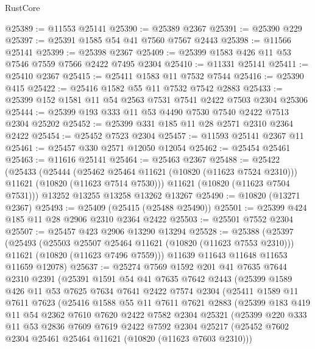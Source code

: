 \begin{lexlean}{RustCore}
\begin{coremodule}
@25389 := @11553 @25141
@25390 := @25389 @2367
@25391 := @25390 @229
@25397 := @25391 @1585 @54 @41 @7560 @7567 @2443
@25398 := @11566 @25141
@25399 := @25398 @2367
@25409 := @25399 @1583 @426 @11 @53 @7546 @7559 @7566 @2422 @7495 @2304
@25410 := @11331 @25141
@25411 := @25410 @2367
@25415 := @25411 @1583 @11 @7532 @7544
@25416 := @25390 @415
@25422 := @25416 @1582 @55 @11 @7532 @7542 @2883
@25433 := @25399 @152 @1581 @11 @54 @2563 @7531 @7541 @2422 @7503 @2304 @25306
@25444 := @25399 @193 @333 @11 @53 @4490 @7530 @7540 @2422 @7513 @2304 @25202
@25452 := @25399 @331 @185 @11 @28 @2571 @2310 @2364 @2422
@25454 := @25452 @7523 @2304
@25457 := @11593 @25141 @2367 @11
@25461 := @25457 @330 @2571 @12050 @12054
@25462 := @25454 @25461
@25463 := @11616 @25141
@25464 := @25463 @2367
@25488 := @25422
    (@25433
      (@25444
        (@25462 @25464 @11621 (@10820 (@11623 @7524 @2310)))
        @11621
        (@10820 (@11623 @7514 @7530)))
      @11621
      (@10820 (@11623 @7504 @7531)))
    @13252
    @13255
    @13258
    @13262
    @13267
@25490 := @10820 (@13271 @2367)
@25493 := @25409 (@25415 (@25488 @25490))
@25501 := @25399 @424 @185 @11 @28 @2906 @2310 @2364 @2422
@25503 := @25501 @7552 @2304
@25507 := @25457 @423 @2906 @13290 @13294
@25528 := @25388
    (@25397
      (@25493
        (@25503 @25507 @25464 @11621 (@10820 (@11623 @7553 @2310)))
        @11621
        (@10820 (@11623 @7496 @7559)))
      @11639
      @11643
      @11648
      @11653
      @11659
      @12078)
@25637 := @25274
    @7569
    @1592
    @201
    @41
    @7635
    @7644
    @2310
    @2391
    (@25391
      @1591
      @54
      @41
      @7635
      @7642
      @2443
      (@25399
        @1589
        @426
        @11
        @53
        @7625
        @7634
        @7641
        @2422
        @7574
        @2304
        (@25411
          @1589
          @11
          @7611
          @7623
          (@25416
            @1588
            @55
            @11
            @7611
            @7621
            @2883
            (@25399
              @183
              @419
              @11
              @54
              @2362
              @7610
              @7620
              @2422
              @7582
              @2304
              @25321
              (@25399
                @220
                @333
                @11
                @53
                @2836
                @7609
                @7619
                @2422
                @7592
                @2304
                @25217
                (@25452 @7602 @2304 @25461 @25464 @11621 (@10820 (@11623 @7603 @2310)))

\end{coremodule}
\end{lexlean}

